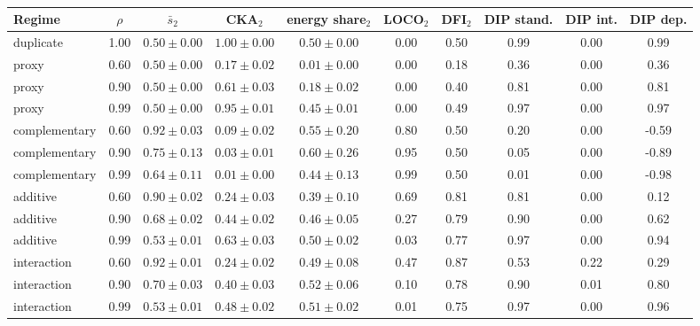 \begin{table}[htbp]\centering\scriptsize
\caption{}\label{tab:dep_sweep}
\begin{tabular}{lc|ccc|ccccc}\toprule
Regime & $\rho$ & $\bar s_2$ & CKA$_2$ & energy share$_2$ & LOCO$_2$ & DFI$_2$ & DIP stand. & DIP int. & DIP dep. \\\midrule
duplicate & 1.00 & $0.50\pm0.00$ & $1.00\pm0.00$ & $0.50\pm0.00$ & 0.00 & 0.50 & 0.99 & 0.00 & 0.99 \\
proxy & 0.60 & $0.50\pm0.00$ & $0.17\pm0.02$ & $0.01\pm0.00$ & 0.00 & 0.18 & 0.36 & 0.00 & 0.36 \\
proxy & 0.90 & $0.50\pm0.00$ & $0.61\pm0.03$ & $0.18\pm0.02$ & 0.00 & 0.40 & 0.81 & 0.00 & 0.81 \\
proxy & 0.99 & $0.50\pm0.00$ & $0.95\pm0.01$ & $0.45\pm0.01$ & 0.00 & 0.49 & 0.97 & 0.00 & 0.97 \\
complementary & 0.60 & $0.92\pm0.03$ & $0.09\pm0.02$ & $0.55\pm0.20$ & 0.80 & 0.50 & 0.20 & 0.00 & -0.59 \\
complementary & 0.90 & $0.75\pm0.13$ & $0.03\pm0.01$ & $0.60\pm0.26$ & 0.95 & 0.50 & 0.05 & 0.00 & -0.89 \\
complementary & 0.99 & $0.64\pm0.11$ & $0.01\pm0.00$ & $0.44\pm0.13$ & 0.99 & 0.50 & 0.01 & 0.00 & -0.98 \\
additive & 0.60 & $0.90\pm0.02$ & $0.24\pm0.03$ & $0.39\pm0.10$ & 0.69 & 0.81 & 0.81 & 0.00 & 0.12 \\
additive & 0.90 & $0.68\pm0.02$ & $0.44\pm0.02$ & $0.46\pm0.05$ & 0.27 & 0.79 & 0.90 & 0.00 & 0.62 \\
additive & 0.99 & $0.53\pm0.01$ & $0.63\pm0.03$ & $0.50\pm0.02$ & 0.03 & 0.77 & 0.97 & 0.00 & 0.94 \\
interaction & 0.60 & $0.92\pm0.01$ & $0.24\pm0.02$ & $0.49\pm0.08$ & 0.47 & 0.87 & 0.53 & 0.22 & 0.29 \\
interaction & 0.90 & $0.70\pm0.03$ & $0.40\pm0.03$ & $0.52\pm0.06$ & 0.10 & 0.78 & 0.90 & 0.01 & 0.80 \\
interaction & 0.99 & $0.53\pm0.01$ & $0.48\pm0.02$ & $0.51\pm0.02$ & 0.01 & 0.75 & 0.97 & 0.00 & 0.96 \\
\bottomrule\end{tabular}\end{table}

